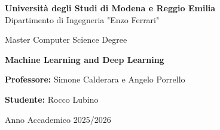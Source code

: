 \documentclass[11pt,a4paper,oneside,openany]{book}
\begin{document}
\begin{titlepage}
  \begin{center}
  
      {\Large \textbf{Università degli Studi di Modena e Reggio Emilia}} \\[2mm]
      {\large Dipartimento di Ingegneria "Enzo Ferrari"} \\[15mm]
  
  
      
      {\large Master Computer Science Degree} \\
      
        \vspace{0.5cm}
      
      {\huge \textbf{Machine Learning and Deep Learning}} \\

  
  
      \begin{flushleft}
          \textbf{Professore:} Simone Calderara e Angelo Porrello \\[5mm]
      \end{flushleft}
  
      \vspace{1.2cm}
  
      \begin{flushright}
          \textbf{Studente:} Rocco Lubino \\
      \end{flushright}
  
      \vspace{2cm}
      {\large Anno Accademico 2025/2026}
  
  \end{center}
\end{titlepage}

\restoregeometry

\tableofcontents
\clearpage
















\end{document}
